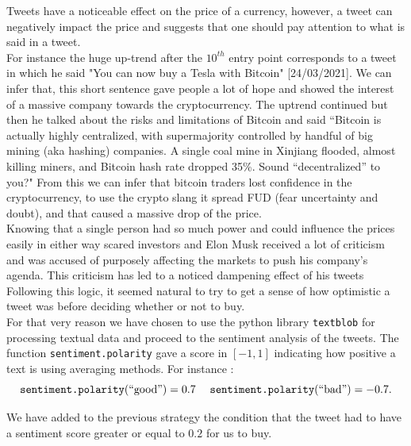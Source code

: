 \documentclass[twoside]{report}
\newcommand{\code}{\texttt}
\begin{document}
\begin{spacing}{1}
 Tweets have a noticeable effect on the price of a currency, however, a tweet can negatively impact the price and suggests that one should pay attention to what is said in a tweet.\\
For instance the huge up-trend after the $10^{th}$ entry point corresponds to a tweet in which he said "You can now buy a Tesla with Bitcoin" [24/03/2021]. We can infer that, this short sentence gave people a lot of hope and showed the interest of a massive company towards the cryptocurrency. The uptrend continued but then he talked about the risks and limitations of Bitcoin and said ``Bitcoin is actually highly centralized, with supermajority controlled by handful of big mining (aka hashing) companies. A single coal mine in Xinjiang flooded, almost killing miners, and Bitcoin hash rate dropped 35\%. Sound “decentralized” to you?" %
From this we can infer that bitcoin traders lost confidence in the cryptocurrency, to use the crypto slang it spread FUD (fear uncertainty and doubt), and that caused a massive drop of the price.\\
Knowing that a single person had so much power and could influence the prices easily in either way scared investors and Elon Musk received a lot of criticism and was accused of purposely affecting the markets to push his company's agenda. This criticism has led to a noticed dampening effect of his tweets \cite{ElonCriticism} \\
Following this logic, it seemed natural to try to get a sense of how optimistic a tweet was before deciding whether or not to buy.\\
For that very reason we have chosen to use the python library \code{textblob} \cite{loria2018textblob} for processing textual data and proceed to the sentiment analysis of the tweets. The function \code{sentiment.polarity} gave a score in $ [-1,1]$ indicating how positive a text is using averaging methods. For instance : \[\code{sentiment.polarity}(``\text{good}")=0.7\;\;\;\:\:\code{sentiment.polarity}(``\text{bad}")=-0.7.\]
\begin{strategy}
We have added to the previous strategy the condition that the tweet had to have a sentiment score greater or equal to $0.2$ for us to buy.\end{strategy}\label{strat:sent} 
\begin{figure}[!htbp]
    \centering

\end{figure}
\end{spacing}
\end{document}
